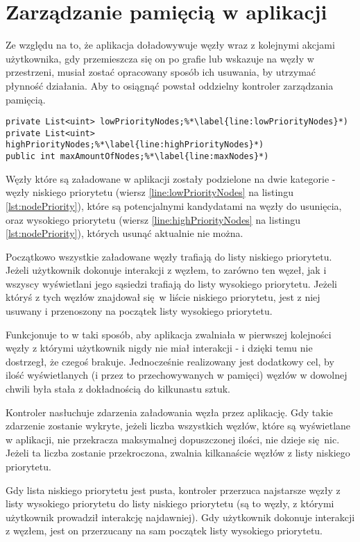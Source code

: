 \section{Zarządzanie pamięcią w aplikacji}
\label{sec:pamiec}
Ze względu na to, że aplikacja doładowywuje węzły wraz z kolejnymi akcjami użytkownika, gdy przemieszcza się on po grafie lub wskazuje na węzły w przestrzeni, musiał zostać opracowany sposób ich usuwania, by utrzymać płynność działania. Aby to osiągnąć powstał oddzielny kontroler zarządzania pamięcią.

\begin{lstlisting}[caption={Pomocnicze struktury i zmienne kontrolera zarządzania pamięcią}, label=lst:nodePriority]
private List<uint> lowPriorityNodes;%*\label{line:lowPriorityNodes}*)
private List<uint> highPriorityNodes;%*\label{line:highPriorityNodes}*)
public int maxAmountOfNodes;%*\label{line:maxNodes}*)
\end{lstlisting}

Węzły które są załadowane w aplikacji zostały podzielone na dwie kategorie - węzły niskiego priorytetu (wiersz \ref{line:lowPriorityNodes} na listingu \ref{lst:nodePriority}), które są potencjalnymi kandydatami na węzły do usunięcia, oraz wysokiego priorytetu (wiersz \ref{line:highPriorityNodes} na listingu \ref{lst:nodePriority}), których usunąć aktualnie nie można.

Początkowo wszystkie załadowane węzły trafiają do listy niskiego priorytetu. Jeżeli użytkownik dokonuje interakcji z węzłem, to zarówno ten węzeł, jak i wszyscy wyświetlani jego sąsiedzi trafiają do listy wysokiego priorytetu. Jeżeli któryś z tych węzłów znajdował się w liście niskiego priorytetu, jest z niej usuwany i przenoszony na początek listy wysokiego priorytetu.

Funkcjonuje to w taki sposób, aby aplikacja zwalniała w pierwszej kolejności węzły z którymi użytkownik nigdy nie miał interakcji - i dzięki temu nie dostrzegł, że czegoś brakuje. Jednocześnie realizowany jest dodatkowy cel, by ilość wyświetlanych (i przez to przechowywanych w pamięci) węzłów w dowolnej chwili była stała z dokładnością do kilkunastu sztuk.

Kontroler nasłuchuje zdarzenia załadowania węzła przez aplikację. Gdy takie zdarzenie zostanie wykryte, jeżeli liczba wszystkich węzłów, które są wyświetlane w aplikacji, nie przekracza maksymalnej dopuszczonej ilości, nie dzieje się nic. Jeżeli ta liczba zostanie przekroczona, zwalnia kilkanaście węzłów z listy niskiego priorytetu.

Gdy lista niskiego priorytetu jest pusta, kontroler przerzuca najstarsze węzły z listy wysokiego priorytetu do listy niskiego priorytetu (są to węzły, z którymi użytkownik prowadził interakcję najdawniej). Gdy użytkownik dokonuje interakcji z węzłem, jest on przerzucany na sam początek listy wysokiego priorytetu.